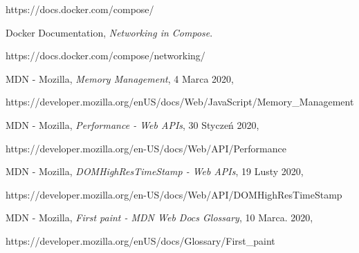 \begin{thebibliography}{99}
https://docs.docker.com/compose/

Docker Documentation,
\textit{Networking in Compose}.

https://docs.docker.com/compose/networking/

MDN - Mozilla,
\textit{Memory Management},
4 Marca 2020,

https://developer.mozilla.org/en\-US/docs/Web/JavaScript/Memory\_Management

MDN - Mozilla,
\textit{Performance - Web APIs},
30 Styczeń 2020,

https://developer.mozilla.org/en-US/docs/Web/API/Performance

MDN - Mozilla,
\textit{DOMHighResTimeStamp - Web APIs},
19 Lusty 2020,

https://developer.mozilla.org/en-US/docs/Web/API/DOMHighResTimeStamp

MDN - Mozilla,
\textit{First paint - MDN Web Docs Glossary},
10 Marca. 2020,

https://developer.mozilla.org/en\-US/docs/Glossary/First\_paint


\end{thebibliography}


